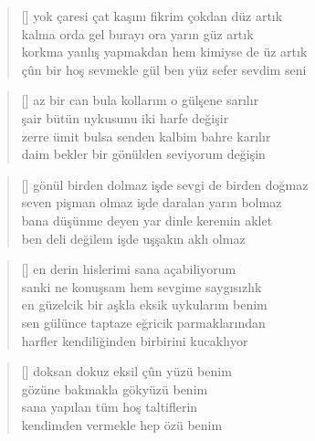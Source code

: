 \documentclass[a5paper, openright, twoside]{memoir}
\begin{document}
\begin{verse}[\versewidth]
  yok çaresi çat kaşını fikrim çokdan düz artık \\
  kalma orda gel burayı ora yarın güz artık \\
  korkma yanlış yapmakdan hem kimiyse de üz artık \\
  çûn bir hoş sevmekle gül ben yüz sefer sevdim seni \\
\end{verse}
\begin{verse}[\versewidth]
  az bir can bula kollarım o gülşene sarılır \\
  şair bütün uykusunu iki harfe değişir \\
  zerre ümit bulsa senden kalbim bahre karılır \\
  daim bekler bir gönülden seviyorum değişin \\
\end{verse}
\begin{verse}[\versewidth]
  gönül birden dolmaz işde sevgi de birden doğmaz \\
  seven pişman olmaz işde daralan yarın bolmaz \\
  bana düşünme deyen yar dinle keremin aklet \\
  ben deli değilem işde uşşakın aklı olmaz \\
\end{verse}
\begin{verse}[\versewidth]
  en derin hislerimi sana açabiliyorum \\
  sanki ne konuşsam hem sevgime saygısızlık \\
  en güzelcik bir aşkla eksik uykularım benim \\
  sen gülünce taptaze eğricik parmaklarından \\
  harfler kendiliğinden birbirini kucaklıyor \\
\end{verse}
\begin{verse}[\versewidth]
  doksan dokuz eksil çûn yüzü benim \\
  gözüne bakmakla gökyüzü benim \\
  sana yapılan tüm hoş taltiflerin \\
  kendimden vermekle hep özü benim \\
\end{verse}
\end{document}

